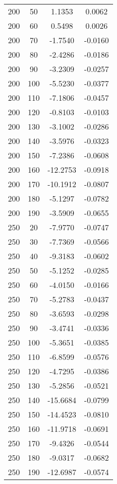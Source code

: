 \documentclass[11pt]{article}
\begin{document}
\begin{center}
\begin{longtable}{cccc}
    200 &    50 & 1.1353 & 0.0062 \\ 
    200 &    60 & 0.5498 & 0.0026 \\ 
    200 &    70 & -1.7540 & -0.0160 \\ 
    200 &    80 & -2.4286 & -0.0186 \\ 
    200 &    90 & -3.2309 & -0.0257 \\ 
    200 &   100 & -5.5230 & -0.0377 \\ 
    200 &   110 & -7.1806 & -0.0457 \\ 
    200 &   120 & -0.8103 & -0.0103 \\ 
    200 &   130 & -3.1002 & -0.0286 \\ 
    200 &   140 & -3.5976 & -0.0323 \\ 
    200 &   150 & -7.2386 & -0.0608 \\ 
    200 &   160 & -12.2753 & -0.0918 \\ 
    200 &   170 & -10.1912 & -0.0807 \\ 
    200 &   180 & -5.1297 & -0.0782 \\ 
    200 &   190 & -3.5909 & -0.0655 \\ 
    250 &    20 & -7.9770 & -0.0747 \\ 
    250 &    30 & -7.7369 & -0.0566 \\ 
    250 &    40 & -9.3183 & -0.0602 \\ 
    250 &    50 & -5.1252 & -0.0285 \\ 
    250 &    60 & -4.0150 & -0.0166 \\ 
    250 &    70 & -5.2783 & -0.0437 \\ 
    250 &    80 & -3.6593 & -0.0298 \\ 
    250 &    90 & -3.4741 & -0.0336 \\ 
    250 &   100 & -5.3651 & -0.0385 \\ 
    250 &   110 & -6.8599 & -0.0576 \\ 
    250 &   120 & -4.7295 & -0.0386 \\ 
    250 &   130 & -5.2856 & -0.0521 \\ 
    250 &   140 & -15.6684 & -0.0799 \\ 
    250 &   150 & -14.4523 & -0.0810 \\ 
    250 &   160 & -11.9718 & -0.0691 \\ 
    250 &   170 & -9.4326 & -0.0544 \\ 
    250 &   180 & -9.0317 & -0.0682 \\ 
    250 &   190 & -12.6987 & -0.0574 \\ 

\end{longtable}
\end{center}
\end{document}
